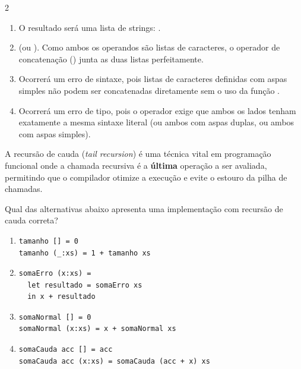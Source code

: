 \documentclass[a4paper,10pt,brazil]{article}
\begin{document}
\begin{multicols}{2}
\begin{enumerate}
  \item O resultado será uma lista de strings: \haskellinline{["Ha", "skell"]}.

  \item {} (ou \haskellinline{['H', 'a', 's', 'k', 'e', 'l', 'l']}). Como ambos os operandos são listas de caracteres, o operador de concatenação (\haskellinline{++}) junta as duas listas perfeitamente.

  \item Ocorrerá um erro de sintaxe, pois listas de caracteres definidas com aspas simples não podem ser concatenadas diretamente sem o uso da função .

  \item Ocorrerá um erro de tipo, pois o operador \haskellinline{++} exige que ambos os lados tenham exatamente a mesma sintaxe literal (ou ambos com aspas duplas, ou ambos com aspas simples).


\end{enumerate}

A recursão de cauda (\emph{tail recursion}) é uma técnica vital em programação funcional onde a chamada recursiva é a \textbf{última} operação a ser avaliada, permitindo que o compilador otimize a execução e evite o estouro da pilha de chamadas. 

Qual das alternativas abaixo apresenta uma implementação com recursão de cauda correta?

\begin{enumerate}
  \item \begin{verbatim}
tamanho [] = 0
tamanho (_:xs) = 1 + tamanho xs
\end{verbatim}

  \item \begin{verbatim}
somaErro (x:xs) = 
  let resultado = somaErro xs 
  in x + resultado
\end{verbatim}

  \item \begin{verbatim}
somaNormal [] = 0
somaNormal (x:xs) = x + somaNormal xs
\end{verbatim}

  \item \begin{verbatim}
somaCauda acc [] = acc
somaCauda acc (x:xs) = somaCauda (acc + x) xs
\end{verbatim}


\end{enumerate}
\end{multicols}
\end{document}
